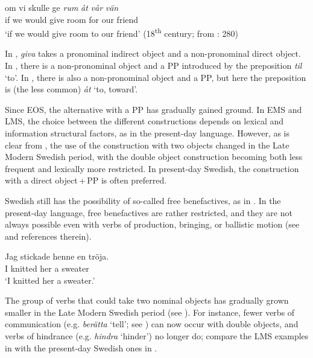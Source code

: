 \documentclass[output=paper]{langscibook}
\begin{document}
\ex \label{ex:intro:22c}
\gll  om   vi     skulle   ge \textit{rum} \textit{åt} \textit{vår} \textit{vän}\\
      if     we   would   give   room for   our   friend\\
    \glt `if we would give room to our friend’ (18\textsuperscript{th} century; from \citealt{Valdeson2016}: 280)
\z
\z

In , \textit{giva} takes a pronominal indirect object and a non-pronominal direct object. In , there is a non-pronominal object and a PP introduced by the preposition \textit{til} ‘to’. In , there is also a non-pronominal object and a PP, but here the preposition is (the less common) \textit{åt} ‘to, toward’.



Since EOS, the alternative with a PP has gradually gained ground. In EMS and LMS, the choice between the different constructions depends on lexical and information structural factors, as in the present-day language. However, as is clear from , the use of the construction with two objects changed in the Late Modern Swedish period, with the double object construction becoming both less frequent and lexically more restricted. In present-day Swedish, the construction with a direct object\,+\,PP is often preferred. 



Swedish still has the possibility of so-called free benefactives, as in . In the present-day language, free benefactives are rather restricted, and they are not always possible even with verbs of production, bringing, or ballistic motion (see \citealt{Lundquist2014Double} and references therein).


\ea\label{ex:intro:23}
\gll  Jag   stickade  henne   en   tröja. \\
I         knitted   her     a     sweater\\
\glt ‘I knitted her a sweater.’
\z


The group of verbs that could take two nominal objects has gradually grown smaller in the Late Modern Swedish period (see \citealt{Valdeson2017}). For instance, fewer verbs of communication (e.g. \textit{berätta} ‘tell’; see \citealt{Silen2005}) can now occur with double objects, and verbs of hindrance (e.g. \textit{hindra} ‘hinder’) no longer do; compare the LMS examples in  with the present-day Swedish ones in .
\end{document}
